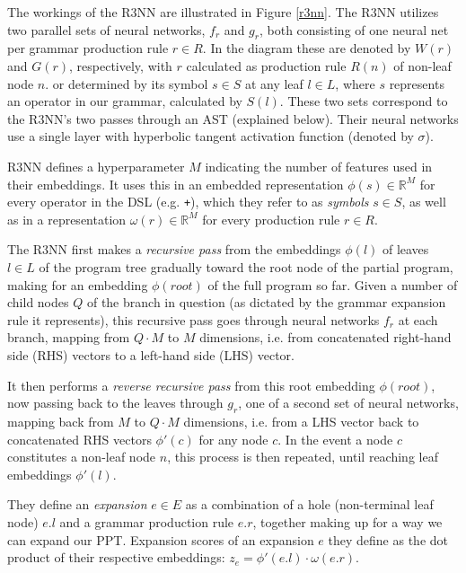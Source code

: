 \documentclass{article} %
\begin{document}
The workings of the R3NN are illustrated in Figure \ref{r3nn}.
The R3NN utilizes two parallel sets of neural networks, $f_r$ and $g_r$,
both consisting of one neural net per grammar production rule $r \in R$.
In the diagram these are denoted by $W(r)$ and $G(r)$, respectively,
with $r$ calculated as production rule $R(n)$ of non-leaf node $n$.
or determined by its symbol $s \in S$ at any leaf $l \in L$,
where $s$ represents an operator in our grammar, calculated by $S(l)$.
These two sets correspond to the R3NN's two passes through an AST (explained below).
Their neural networks use a single layer with hyperbolic tangent activation function (denoted by $\sigma$).

R3NN defines a hyperparameter $M$ indicating the number of features used in their embeddings.
It uses this in an embedded representation $\phi(s) \in \mathbb{R}^M$
for every operator in the DSL (e.g. \verb|+|), which they refer to as \emph{symbols} $s \in S$,
as well as in a representation $\omega(r) \in \mathbb{R}^M$ for every production rule $r \in R$.

The R3NN first makes a \emph{recursive pass} from the embeddings $\phi(l)$
of leaves $l \in L$ of the program tree gradually toward the root node of the partial program,
making for an embedding $\phi(root)$ of the full program so far.
Given a number of child nodes $Q$ of the branch in question
(as dictated by the grammar expansion rule it represents),
this recursive pass goes through neural networks $f_r$ at each branch,
mapping from $Q \cdot M$ to $M$ dimensions,
i.e. from concatenated right-hand side (RHS) vectors to a left-hand side (LHS) vector.

It then performs a \emph{reverse recursive pass} from this root embedding $\phi(root)$,
now passing back to the leaves through $g_r$,
one of a second set of neural networks,
mapping back from $M$ to $Q \cdot M$ dimensions,
i.e. from a LHS vector back to concatenated RHS vectors $\phi'(c)$ for any node $c$.
%
In the event a node $c$ constitutes a non-leaf node $n$,
this process is then repeated, until reaching leaf embeddings $\phi'(l)$.

They define an \emph{expansion} $e \in E$ as a combination of a hole (non-terminal leaf node) $e.l$ and a grammar production rule $e.r$, together making up for a way we can expand our PPT.
Expansion scores of an expansion $e$ they define as the dot product of their respective embeddings:
$z_e = \phi'(e.l) \cdot \omega(e.r)$.
\end{document}
